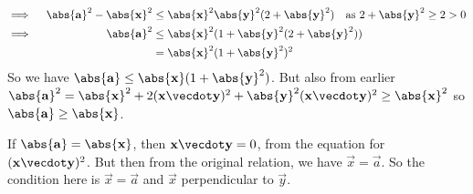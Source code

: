 \documentclass[fleqn,a4paper,11pt]{article}
\begin{document}
\begin{enumerate}
\begin{alignat*}
     \implies{}&& \abs{\vec a}^2 - \abs{\vec x}^2 &\le
        \abs{\vec x}^2\abs{\vec y}^2(2 + \abs{\vec y}^2) \quad
        \text{as \(2 + \abs{\vec y}^2 \ge 2 > 0\)} \\
     \implies{}&& \abs{\vec a}^2 &\le
        \abs{\vec x}^2(1 + \abs{\vec y}^2(2 + \abs{\vec y}^2)) \\
     &&        &= \abs{\vec x}^2(1 + \abs{\vec y}^2)^2
    \end{alignat*}
    So we have \(\abs{\vec a} \le \abs{\vec x}(1 + \abs{\vec y}^2)\).
    But also from earlier
    \(\abs{\vec a}^2 = \abs{\vec x}^2 + 2(\vec x \vecdot \vec y)^2
                       + \abs{\vec y}^2(\vec x \vecdot \vec y)^2
                     \ge \abs{\vec x}^2\)
    so \(\abs{\vec a} \ge \abs{\vec x}\).

    If \(\abs{\vec a} = \abs{\vec x}\), then \(\vec x \vecdot \vec y = 0\), from
    the equation for \((\vec x \vecdot \vec y)^2\). But then from the original
    relation, we have \(\vec x = \vec a\). So the condition here is
    \(\vec x = \vec a\) and \(\vec x\) perpendicular to \(\vec y\).


\end{enumerate}
\end{document}
